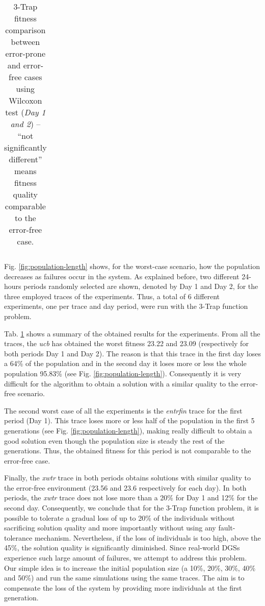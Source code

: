 \documentclass[graybox]{sty/svmult}
\begin{document}
\begin{table}
\begin{tiny}
\begin{center}
\begin{tabular}{|l| l c l c |c| c l c|}
\hline
\end{tabular}
\end{center}
\end{tiny}
    \caption{3-Trap fitness comparison between error-prone and error-free cases using Wilcoxon test (\emph{Day 1 and 2}) -- ``not significantly
    different'' means fitness quality comparable to the error-free case.}
    \label{tab:trap3-day1-day2-wilcoxon}
\end{table}

Fig. \ref{fig:population-length} shows, for the worst-case scenario, how the population decreases as failures occur in the
system. As explained before, two different 24-hours periods randomly selected are shown, denoted by Day 1 and Day 2,
for the three employed traces of the experiments. Thus, a total of 6 different experiments, one per trace and day period,
were run with the 3-Trap function problem. 

Tab. \ref{tab:trap3-day1-day2-wilcoxon} shows a summary of the obtained results for the experiments. From all the traces,
the \emph{ucb}  has obtained the worst fitness 23.22 and 23.09 (respectively for both periods Day 1 and Day 2). The reason is that this trace in the first day loses a 64\% of the population and in the second day it loses 
more or less the whole population 95.83\% (see Fig. \ref{fig:population-length}). Consequently it is very difficult for the
algorithm to obtain a solution with a similar quality to the error-free scenario. 

The second worst case of all the experiments is the \emph{entrfin} trace for the first period (Day 1). This trace loses more or less half of the
population in the first 5 generations (see Fig. \ref{fig:population-length}), making really difficult to obtain a good
solution even though the population size is steady the rest of the generations. Thus, the obtained fitness for this period is not comparable to the error-free
case.

Finally, the \emph{xwtr} trace in both periods obtains solutions with similar quality to the error-free environment (23.56 and 23.6
respectively for each day). In both periods, the \emph{xwtr} trace does not lose more than a 20\% for Day 1 and 12\% for the second
day. Consequently, we conclude that for the 3-Trap function problem, it is possible to tolerate a gradual loss of up to 20\% of the
individuals  without sacrificing solution quality and more importantly without using any fault-tolerance mechanism.
Nevertheless, if the loss of individuals is too high, above the 45\%, the solution quality is significantly diminished. Since
real-world DGSs experience such large amount of failures, we attempt to address this problem. Our simple idea is to increase
the initial population size (a 10\%, 20\%, 30\%, 40\% and 50\%) and run the same simulations using the same traces. The aim
is to compensate the loss of the system by providing more individuals at the first generation. 
\end{document}
